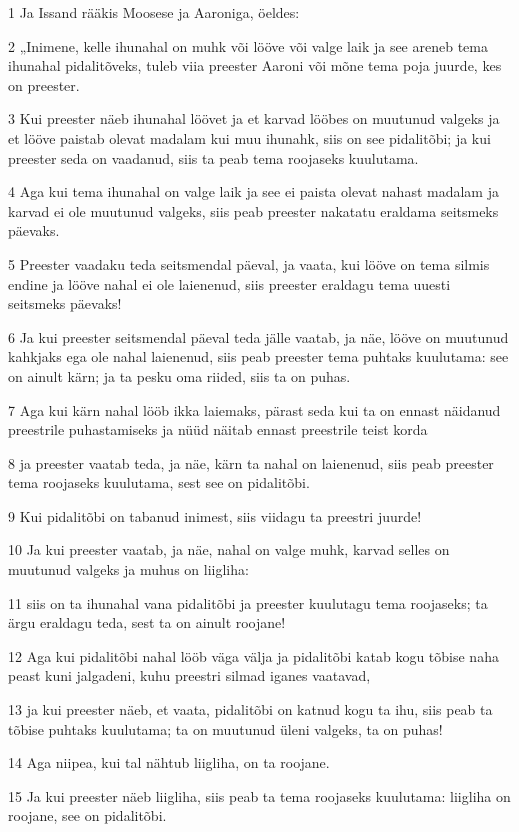\par 1 Ja Issand rääkis Moosese ja Aaroniga, öeldes:
\par 2 „Inimene, kelle ihunahal on muhk või lööve või valge laik ja see areneb tema ihunahal pidalitõveks, tuleb viia preester Aaroni või mõne tema poja juurde, kes on preester.
\par 3 Kui preester näeb ihunahal löövet ja et karvad lööbes on muutunud valgeks ja et lööve paistab olevat madalam kui muu ihunahk, siis on see pidalitõbi; ja kui preester seda on vaadanud, siis ta peab tema roojaseks kuulutama.
\par 4 Aga kui tema ihunahal on valge laik ja see ei paista olevat nahast madalam ja karvad ei ole muutunud valgeks, siis peab preester nakatatu eraldama seitsmeks päevaks.
\par 5 Preester vaadaku teda seitsmendal päeval, ja vaata, kui lööve on tema silmis endine ja lööve nahal ei ole laienenud, siis preester eraldagu tema uuesti seitsmeks päevaks!
\par 6 Ja kui preester seitsmendal päeval teda jälle vaatab, ja näe, lööve on muutunud kahkjaks ega ole nahal laienenud, siis peab preester tema puhtaks kuulutama: see on ainult kärn; ja ta pesku oma riided, siis ta on puhas.
\par 7 Aga kui kärn nahal lööb ikka laiemaks, pärast seda kui ta on ennast näidanud preestrile puhastamiseks ja nüüd näitab ennast preestrile teist korda
\par 8 ja preester vaatab teda, ja näe, kärn ta nahal on laienenud, siis peab preester tema roojaseks kuulutama, sest see on pidalitõbi.
\par 9 Kui pidalitõbi on tabanud inimest, siis viidagu ta preestri juurde!
\par 10 Ja kui preester vaatab, ja näe, nahal on valge muhk, karvad selles on muutunud valgeks ja muhus on liigliha:
\par 11 siis on ta ihunahal vana pidalitõbi ja preester kuulutagu tema roojaseks; ta ärgu eraldagu teda, sest ta on ainult roojane!
\par 12 Aga kui pidalitõbi nahal lööb väga välja ja pidalitõbi katab kogu tõbise naha peast kuni jalgadeni, kuhu preestri silmad iganes vaatavad,
\par 13 ja kui preester näeb, et vaata, pidalitõbi on katnud kogu ta ihu, siis peab ta tõbise puhtaks kuulutama; ta on muutunud üleni valgeks, ta on puhas!
\par 14 Aga niipea, kui tal nähtub liigliha, on ta roojane.
\par 15 Ja kui preester näeb liigliha, siis peab ta tema roojaseks kuulutama: liigliha on roojane, see on pidalitõbi.

